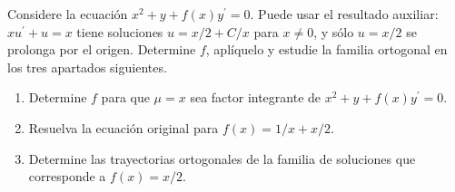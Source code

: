 Considere la ecuación $x^2+y+f(x)y^{\prime}=0$. Puede usar el resultado auxiliar: $xu^{\prime}+u=x$ tiene soluciones $u=x/2+C/x$ para $x\ne0$, y sólo $u=x/2$ se prolonga por el origen. Determine $f$, aplíquelo y estudie la familia ortogonal en los tres apartados siguientes.

\begin{enumerate}[label=(\alph*),ref=\alph*,leftmargin=*]
\item Determine $f$ para que $\mu=x$ sea factor integrante de $x^2+y+f(x)y^{\prime}=0$.
\item Resuelva la ecuación original para $f(x)=1/x+x/2$.
\item Determine las trayectorias ortogonales de la familia de soluciones que corresponde a $f(x)=x/2$.
\end{enumerate}
